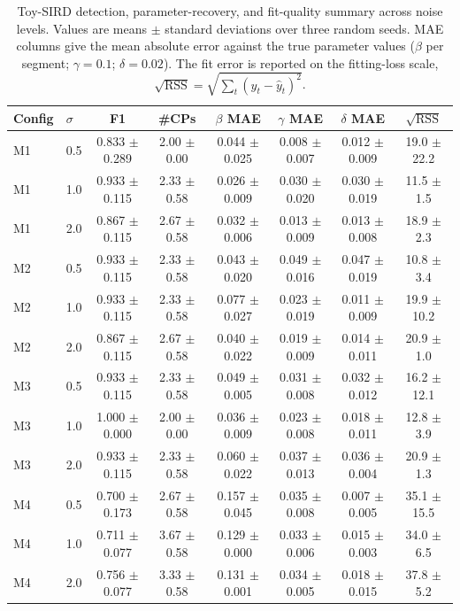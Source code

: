 \begin{table}[htbp]
\centering
\footnotesize
\caption{Toy-SIRD detection, parameter-recovery, and fit-quality summary across noise levels. Values are means $\pm$ standard deviations over three random seeds. MAE columns give the mean absolute error against the true parameter values ($\beta$ per segment; $\gamma=0.1$; $\delta=0.02$). The fit error is reported on the fitting-loss scale, $\sqrt{\mathrm{RSS}}=\sqrt{\sum_t (y_t-\hat{y}_t)^2}$.}
\label{tab:sird-summary}
\begin{tabular}{llcccccc}
\toprule
Config & $\sigma$ & F1 & \#CPs & $\beta$ MAE & $\gamma$ MAE & $\delta$ MAE & $\sqrt{\mathrm{RSS}}$ \\
\midrule
M1 & 0.5 & 0.833 $\pm$ 0.289 & 2.00 $\pm$ 0.00 & 0.044 $\pm$ 0.025 & 0.008 $\pm$ 0.007 & 0.012 $\pm$ 0.009 & 19.0 $\pm$ 22.2 \\
M1 & 1.0 & 0.933 $\pm$ 0.115 & 2.33 $\pm$ 0.58 & 0.026 $\pm$ 0.009 & 0.030 $\pm$ 0.020 & 0.030 $\pm$ 0.019 & 11.5 $\pm$ 1.5 \\
M1 & 2.0 & 0.867 $\pm$ 0.115 & 2.67 $\pm$ 0.58 & 0.032 $\pm$ 0.006 & 0.013 $\pm$ 0.009 & 0.013 $\pm$ 0.008 & 18.9 $\pm$ 2.3 \\
M2 & 0.5 & 0.933 $\pm$ 0.115 & 2.33 $\pm$ 0.58 & 0.043 $\pm$ 0.020 & 0.049 $\pm$ 0.016 & 0.047 $\pm$ 0.019 & 10.8 $\pm$ 3.4 \\
M2 & 1.0 & 0.933 $\pm$ 0.115 & 2.33 $\pm$ 0.58 & 0.077 $\pm$ 0.027 & 0.023 $\pm$ 0.019 & 0.011 $\pm$ 0.009 & 19.9 $\pm$ 10.2 \\
M2 & 2.0 & 0.867 $\pm$ 0.115 & 2.67 $\pm$ 0.58 & 0.040 $\pm$ 0.022 & 0.019 $\pm$ 0.009 & 0.014 $\pm$ 0.011 & 20.9 $\pm$ 1.0 \\
M3 & 0.5 & 0.933 $\pm$ 0.115 & 2.33 $\pm$ 0.58 & 0.049 $\pm$ 0.005 & 0.031 $\pm$ 0.008 & 0.032 $\pm$ 0.012 & 16.2 $\pm$ 12.1 \\
M3 & 1.0 & 1.000 $\pm$ 0.000 & 2.00 $\pm$ 0.00 & 0.036 $\pm$ 0.009 & 0.023 $\pm$ 0.008 & 0.018 $\pm$ 0.011 & 12.8 $\pm$ 3.9 \\
M3 & 2.0 & 0.933 $\pm$ 0.115 & 2.33 $\pm$ 0.58 & 0.060 $\pm$ 0.022 & 0.037 $\pm$ 0.013 & 0.036 $\pm$ 0.004 & 20.9 $\pm$ 1.3 \\
M4 & 0.5 & 0.700 $\pm$ 0.173 & 2.67 $\pm$ 0.58 & 0.157 $\pm$ 0.045 & 0.035 $\pm$ 0.008 & 0.007 $\pm$ 0.005 & 35.1 $\pm$ 15.5 \\
M4 & 1.0 & 0.711 $\pm$ 0.077 & 3.67 $\pm$ 0.58 & 0.129 $\pm$ 0.000 & 0.033 $\pm$ 0.006 & 0.015 $\pm$ 0.003 & 34.0 $\pm$ 6.5 \\
M4 & 2.0 & 0.756 $\pm$ 0.077 & 3.33 $\pm$ 0.58 & 0.131 $\pm$ 0.001 & 0.034 $\pm$ 0.005 & 0.018 $\pm$ 0.015 & 37.8 $\pm$ 5.2 \\
\bottomrule
\end{tabular}
\end{table}
